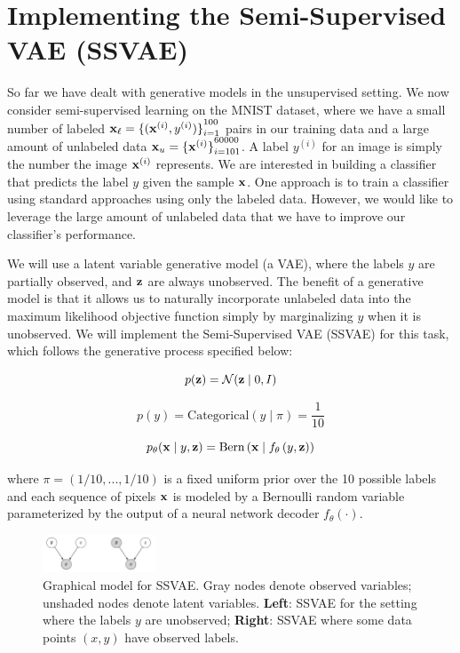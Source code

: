 \section{Implementing the Semi-Supervised VAE (SSVAE)}

So far we have dealt with generative models in the unsupervised setting. We now consider semi-supervised learning on the 
MNIST dataset, where we have a small number of labeled $\mathbf{x}_{\ell} = {\{(\mathbf{x}^{(i)},y^{(i)})\}}_{i=1}^{100}$ pairs in our 
training data and a large amount of unlabeled data $\mathbf{x}_{u} = {\{\mathbf{x}^{(i)}\}}_{i=101}^{60000}$. A label $y^{(i)}$ for an 
image is simply the number the image $\mathbf{x}^{(i)}$ represents. We are interested in building a classifier that predicts the 
label $y$ given the sample $\mathbf{x}$. One approach is to train a classifier using standard approaches using only the labeled data. 
However, we would like to leverage the large amount of unlabeled data that we have to improve our classifier’s performance.

We will use a latent variable generative model (a VAE), where the labels $y$ are partially observed, and $\mathbf{z}$ are always unobserved. 
The benefit of a generative model is that it allows us to naturally incorporate unlabeled data into the maximum likelihood 
objective function simply by marginalizing $y$ when it is unobserved. We will implement the Semi-Supervised VAE (SSVAE) 
for this task, which follows the generative process specified below:

\begin{equation}\label{eq:15}
    p(\mathbf{z}) = \mathcal{N}(\mathbf{z} \mid 0, I)
\end{equation}


\begin{equation} \label{eq:16}
    p(y) = \text{Categorical}(y \mid \pi) = \frac{1}{10}
\end{equation}

\begin{equation} \label{eq:17}
    p_{\theta}(\mathbf{x} \mid y, \mathbf{z}) = \text{Bern}\left(\mathbf{x} \mid f_{\theta}\left(y,\mathbf{z}\right)\right)
\end{equation}

where $\pi = (1/10,...,1/10)$ is a fixed uniform prior over the 10 possible labels and each sequence of pixels $\mathbf{x}$ is 
modeled by a Bernoulli random variable parameterized by the output of a neural network decoder $f_{\theta}(\cdot)$.

\begin{figure}[h]
    \centering
    \includegraphics[width=0.3\textwidth]{./figures/ssvae}
    \caption{Graphical model for SSVAE. Gray nodes denote observed variables; unshaded nodes denote latent variables. \textbf{Left}: SSVAE for the setting where the labels $y$ are unobserved; \textbf{Right}: SSVAE where some data points $(x, y)$ have observed labels.}
    \label{fig:ssvae}
\end{figure}

